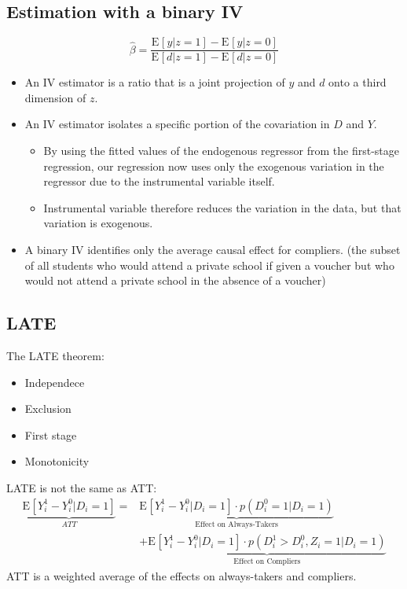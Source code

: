 \documentclass[
]{ctexart}
\providecommand{\tightlist}{%
  \setlength{\itemsep}{0pt}\setlength{\parskip}{0pt}}
\def\ba{\begin{aligned}}
\def\ea{\end{aligned}}
\newcommand{\0}{\textbf 0}
\newcommand{\1}{\textbf 1}
\providecommand{\e}{}\renewcommand{\e}[2][]{\text{E}_{#1}\br{#2}}
\def\br#1{\left[#1\right]}
\def\pr#1{\left(#1\right)}
\begin{document}
\hypertarget{estimation-with-a-binary-iv}{%
\subsection{Estimation with a binary
IV}\label{estimation-with-a-binary-iv}}

\[
\hat \beta = \frac{\e{y|z = 1}-\e{y|z= 0}}{\e{d|z = 1}-\e{d|z = 0}}
\]

\begin{itemize}
\tightlist
\item
  An IV estimator is a ratio that is a joint projection of \(y\) and
  \(d\) onto a third dimension of \(z\).
\item
  An IV estimator isolates a specific portion of the covariation in
  \(D\) and \(Y\).

  \begin{itemize}
  \tightlist
  \item
    By using the fitted values of the endogenous regressor from the
    first-stage regression, our regression now uses only the exogenous
    variation in the regressor due to the instrumental variable itself.
  \item
    Instrumental variable therefore reduces the variation in the data,
    but that variation is exogenous.
  \end{itemize}
\item
  A binary IV identifies only the average causal effect for compliers.
  (the subset of all students who would attend a private school if given
  a voucher but who would not attend a private school in the absence of
  a voucher)
\end{itemize}

\hypertarget{late}{%
\subsection{LATE}\label{late}}

The LATE theorem:

\begin{itemize}
\tightlist
\item
  Independece
\item
  Exclusion
\item
  First stage
\item
  Monotonicity
\end{itemize}

LATE is not the same as ATT: \[
\ba
\underbrace{\e{Y_i^1-Y_i^0|D_i = 1}}_{ATT} = & \underbrace{\e{Y_i^1-Y_i^0|D_i = 1}\cdot p\pr{D_i^0 = 1|D_i = 1}}_{\text{Effect on Always-Takers}}\\
& + \underbrace{\e{Y_i^1-Y_i^0|D_i = 1}\cdot p\pr{D_i^1>D_i^0,Z_i = 1|D_i = 1}}_{\text{Effect on Compliers}}
\ea
\] ATT is a weighted average of the effects on always-takers and
compliers.
\end{document}
